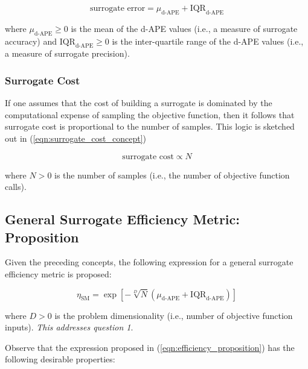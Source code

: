 \documentclass[conference]{IEEEtran}
\begin{document}
\begin{equation}
	\textrm{surrogate error} = \mu_\textrm{d-APE} + \text{IQR}_\textrm{d-APE}
	\label{eqn:surrogate_error}
\end{equation}

\noindent where $\mu_\textrm{d-APE} \geq 0$ is the mean of the d-APE values (i.e., a measure of surrogate accuracy) and $\text{IQR}_\textrm{d-APE} \geq 0$ is the inter-quartile range of the d-APE values (i.e., a measure of surrogate precision).

\subsubsection{Surrogate Cost}

If one assumes that the cost of building a surrogate is dominated by the computational expense of sampling the objective function, then it follows that surrogate cost is proportional to the number of samples. This logic is sketched out in (\ref{eqn:surrogate_cost_concept})

\begin{equation}
	\textrm{surrogate cost} \propto N
	\label{eqn:surrogate_cost_concept}
\end{equation}

\noindent where $N > 0$ is the number of samples (i.e., the number of objective function calls).

\subsection{General Surrogate Efficiency Metric: Proposition}

Given the preceding concepts, the following expression for a general surrogate efficiency metric is proposed:

\begin{equation}
	\eta_\textrm{SM} = \exp\left[-\sqrt[D]{N}(\mu_\textrm{d-APE} + \textrm{IQR}_\textrm{d-APE})\right]
	\label{eqn:efficiency_proposition}
\end{equation}

\noindent where $D>0$ is the problem dimensionality (i.e., number of objective function inputs). \textit{This addresses question 1}.

	Observe that the expression proposed in (\ref{eqn:efficiency_proposition}) has the following desirable properties:
\end{document}
